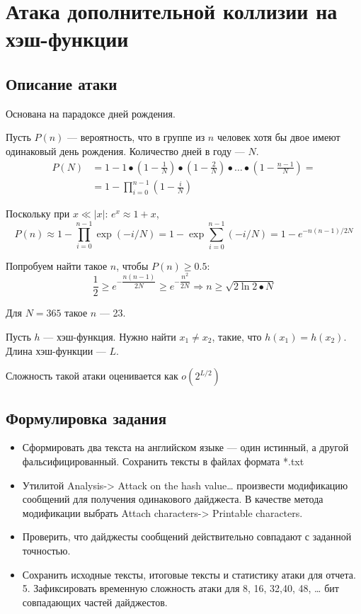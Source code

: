 \documentclass[a4paper, 14pt]{extarticle}
\begin{document}
\section{Атака дополнительной коллизии на хэш-функции}
\subsection{Описание атаки}
Основана на парадоксе дней рождения.

Пусть $P(n)$ --- вероятность, что в группе из $n$ человек хотя бы двое имеют одинаковый день рождения. Количество дней в году --- $N$.
\begin{equation}
    \begin{split}
        P(N) &= 1 - 1 \bullet \left( 1 - \frac{1}{N} \right) \bullet \left( 1 - \frac{2}{N} \right) \bullet \ldots \bullet \left( 1 - \frac{n-1}{N} \right) = \\
             &= 1 - \prod_{i=0}^{n-1} \left( 1 - \frac{i}{N} \right)
    \end{split}
\end{equation}

Поскольку при $x \ll |x|$: $e^x \approx 1 + x$,
\begin{equation}
    P(n) \approx 1 - \prod_{i=0}^{n-1} \exp{(-i/N)} = 1 - \exp \sum_{i=0}^{n-1} (-i / N) = 1 - e^{-n(n-1)/2N}
\end{equation}

Попробуем найти такое $n$, чтобы $P(n) \ge 0.5$:
\begin{equation}
    \frac{1}{2} \ge e^{- \dfrac{n(n-1)}{2N} } \ge e^{- \dfrac{n^2}{2N}} \Rightarrow n \ge \sqrt{2 \ln 2 \bullet N}
\end{equation}

Для $N=365$ такое $n$ --- 23.

Пусть $h$ --- хэш-функция. Нужно найти $x_1 \ne x_2$, такие, что $h(x_1) = h(x_2)$. Длина хэш-функции --- $L$.

Сложность такой атаки оценивается как $o(2^{L/2})$

\subsection{Формулировка задания}
\begin{itemize}
    \item  Сформировать два текста на английском языке --- один истинный, а другой фальсифицированный. Сохранить тексты в файлах формата *.txt
    \item  Утилитой Analysis-> Attack on the hash value\ldots{} произвести модификацию сообщений для получения одинакового дайджеста. В качестве метода модификации выбрать Attach characters-> Printable characters.
    \item  Проверить, что дайджесты сообщений действительно совпадают с заданной точностью.
    \item  Сохранить исходные тексты, итоговые тексты и статистику атаки для отчета.
5. Зафиксировать временную сложность атаки для 8, 16, 32,40, 48, … бит совпадающих частей дайджестов.
\end{itemize}
\end{document}
